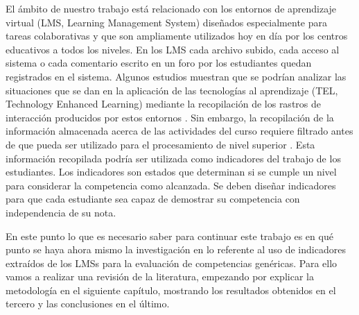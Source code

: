 El ámbito de nuestro trabajo está relacionado con los entornos de aprendizaje virtual (LMS, Learning Management System) diseñados especialmente para tareas colaborativas y que son ampliamente utilizados hoy en día por los centros educativos a todos los niveles. En los LMS cada archivo subido, cada acceso al sistema o cada comentario escrito en un foro por los estudiantes quedan registrados en el sistema. Algunos estudios muestran que se podrían analizar las situaciones que se dan en la aplicación de las tecnologías al aprendizaje (TEL, Technology Enhanced Learning) mediante la recopilación de los rastros de interacción producidos por estos entornos \cite{Chebil:2012}. Sin embargo, la recopilación de la información almacenada acerca de las actividades del curso requiere filtrado antes de que pueda ser utilizado para el procesamiento de nivel superior \cite{Florian:2011}. Esta información recopilada podría ser utilizada como indicadores del trabajo de los estudiantes. Los indicadores son estados que determinan si se cumple un nivel para considerar la competencia como alcanzada. Se deben diseñar indicadores para que cada estudiante sea capaz de demostrar su competencia con independencia de su nota. 

En este punto lo que es necesario saber para continuar este trabajo es en qué punto se haya ahora mismo la investigación en lo referente al uso de indicadores extraídos de los LMSs para la evaluación de competencias genéricas. Para ello vamos a realizar una revisión de la literatura, empezando por explicar la metodología en el siguiente capítulo, mostrando los resultados obtenidos en el tercero y las conclusiones en el último.




